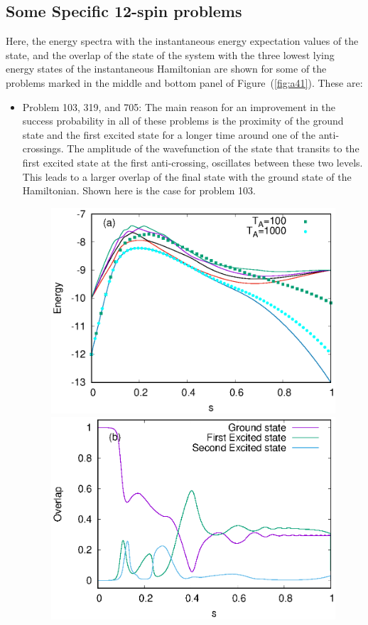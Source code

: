 \documentclass[../main.tex]{subfiles}
\begin{document}
\begin{appendices}
\chapter{Some Specific 12-spin problems}
Here, the energy spectra with the instantaneous energy expectation values of the state, and the overlap of the state of the system with the three lowest lying energy states of the instantaneous Hamiltonian are shown for some of the problems marked in the middle and bottom panel of Figure~(\ref{fig:a41}). These are:

\begin{itemize}
\item Problem 103, 319, and 705: The main reason for an improvement in the success probability in all of these problems is the proximity of the ground state and the first excited state for a longer time around one of the anti-crossings. The amplitude of the wavefunction of the state that transits to the first excited state at the first anti-crossing, oscillates between these two levels. This leads to a larger overlap of the final state with the ground state of the Hamiltonian. Shown here is the case for problem 103.
\begin{figure}
\centering 
\includegraphics[scale=0.8]{103_A_g2.eps}
\includegraphics[scale=0.8]{103_A_g2_Overlap.eps}

\end{figure}
\end{itemize}
\end{appendices}
\end{document}
